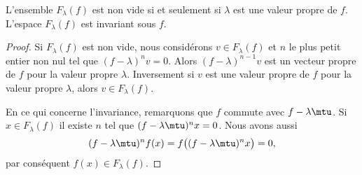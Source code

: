 \begin{lemma}   \label{LemBLPooHMAoyJ}
    L'ensemble \( F_{\lambda}(f)\) est non vide si et seulement si \( \lambda\) est une valeur propre de \( f\). L'espace \( F_{\lambda}(f)\) est invariant sous \( f\).
\end{lemma}

\begin{proof}
    Si \( F_{\lambda}(f)\) est non vide, nous considérons \( v\in F_{\lambda}(f)\) et \( n\) le plus petit entier non nul tel que \( (f-\lambda)^nv=0\). Alors \( (f-\lambda)^{n-1}v\) est un vecteur propre de \( f\) pour la valeur propre \( \lambda\). Inversement si \( v\) est une valeur propre de \( f\) pour la valeur propre \( \lambda\), alors \( v\in F_{\lambda}(f)\).

    En ce qui concerne l'invariance, remarquons que \( f\) commute avec \( f-\lambda\mtu\). Si \( x\in F_{\lambda}(f)\) il existe \( n\) tel que \( (f-\lambda\mtu)^nx=0\). Nous avons aussi
    \begin{equation}
        (f-\lambda\mtu)^nf(x)=f\big( (f-\lambda\mtu)^nx \big)=0,
    \end{equation}
    par conséquent \( f(x)\in F_{\lambda}(f)\).
\end{proof}

